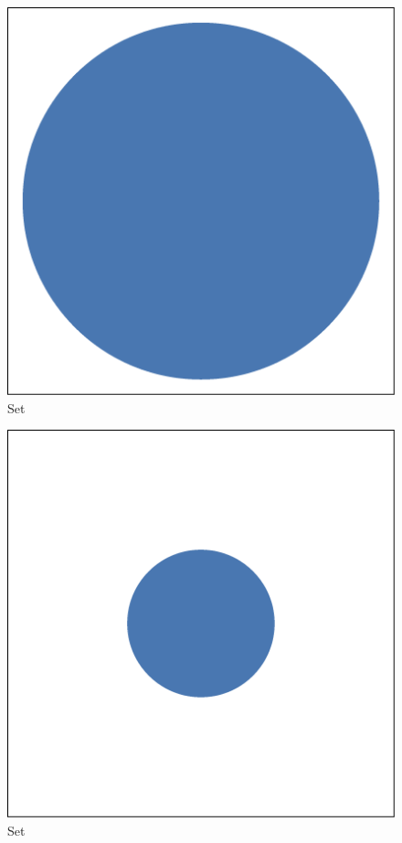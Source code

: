 
\begin{subfigure}{0.23\columnwidth}
	\centering
	\includegraphics[width=\textwidth]{experiment/img/singlesphereimpression_ferdosi1.png}
	\caption{Set \ferdosiOne}
	\label{fig:experiment:singlesphere:projection:ferdosi1}
\end{subfigure}
\begin{subfigure}{0.23\columnwidth}
	\centering
	\includegraphics[width=\textwidth]{experiment/img/singlesphereimpression_baakman1.png}
	\caption{Set \baakmanOne}
	\label{fig:experiment:singlesphere:projection:baakman1}
\end{subfigure}
